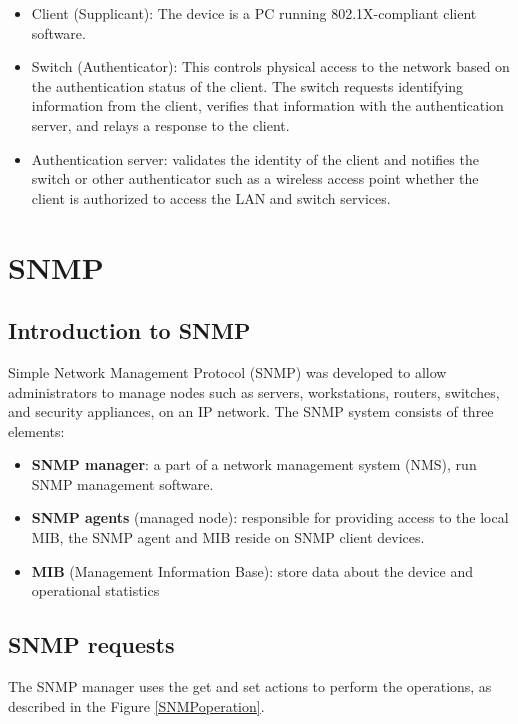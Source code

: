 \begin{itemize}
\item Client (Supplicant): The device is a PC running 802.1X-compliant client software.
\item Switch (Authenticator): This controls physical access to the network based on the authentication status of the client. The switch requests identifying information from the client, verifies that information with the authentication server, and relays a response to the client.
\item Authentication server: validates the identity of the client and notifies the switch or other authenticator such as a wireless access point whether the client is authorized to access the LAN and switch services.
\end{itemize}

\section{SNMP}

\subsection{Introduction to SNMP}

Simple Network Management Protocol (SNMP) was developed to allow administrators to manage nodes such as servers, workstations, routers, switches, and security appliances, on an IP network. The SNMP system consists of three elements:

\begin{itemize}
\item \textbf{SNMP manager}: a part of a network management system (NMS), run SNMP management software. 
\item \textbf{SNMP agents} (managed node):  responsible for providing access to the local MIB, the SNMP agent and MIB reside on SNMP client devices.
\item \textbf{MIB} (Management Information Base): store data about the device and operational statistics 
\end{itemize}

\subsection{SNMP requests}

The SNMP manager uses the get and set actions to perform the operations, as described in the Figure \ref{SNMPoperation}.


